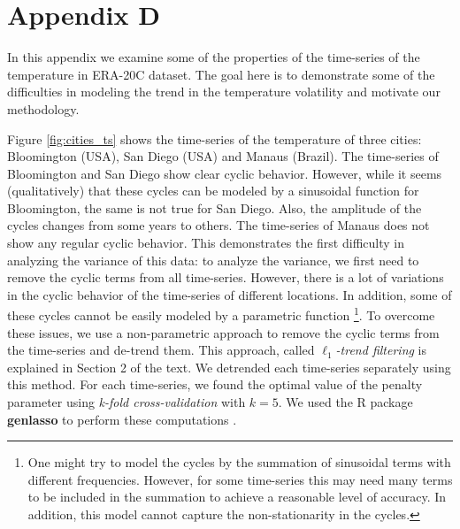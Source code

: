\documentclass{article}
\begin{document}
\section{Appendix D}

In this appendix we examine some of the properties of the time-series of the temperature in ERA-20C dataset. The goal here is to demonstrate some of the difficulties in modeling the trend in the temperature volatility and motivate our methodology.

Figure \autoref{fig:cities_ts} shows the time-series of the temperature of three cities: Bloomington (USA), San Diego (USA) and Manaus (Brazil). The time-series of Bloomington and San Diego show clear cyclic behavior. However, while it seems (qualitatively) that these cycles can be modeled by a sinusoidal function for Bloomington, the same is not true for San Diego. Also, the amplitude of the cycles changes from some years to others. The time-series of Manaus does not show any regular cyclic behavior. This demonstrates the first difficulty in analyzing the variance of this data: to analyze the variance, we first need to remove the cyclic terms from all time-series. However, there is a lot of variations in the cyclic behavior of the time-series of different locations. In addition, some of these cycles cannot be easily modeled by a parametric function \footnote{One might try to model the cycles by the summation of sinusoidal terms with different frequencies. However, for some time-series this may need many terms to be included in the summation to achieve a reasonable level of accuracy. In addition, this model cannot capture the non-stationarity in the cycles.}. To overcome these issues, we use a non-parametric approach to remove the cyclic terms from the time-series and de-trend them. This approach, called \textit{$\ell_1$-trend filtering} is explained in Section 2 of the text. We detrended each time-series separately using this method. For each time-series, we found the optimal value of the penalty parameter using \textit{k-fold cross-validation} with $k=5$. We used the R package \textbf{genlasso} to perform these computations \cite{arnold_efficient_2016}. 
\end{document}
